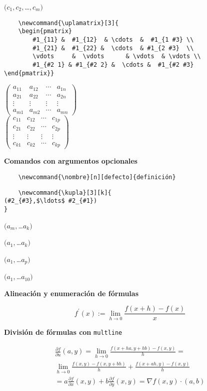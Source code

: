 \documentclass[12pt]{book}
\newcommand{\tto}{\longrightarrow}
\newcommand{\parcial}[2]{\frac{\partial#1}{\partial#2}}
\newcommand{\upla}[2]{(#1_1,#1_2,$\ldots$,#1_{#2})}
\newcommand{\uplamatrix}[3]{
	\begin{pmatrix}  
		#1_{11} &  #1_{12}  & \cdots  &  #1_{1 #3} \\   
		#1_{21} &  #1_{22} &  \cdots  & #1_{2 #3}  \\ 
		\vdots     &  \vdots      & \vdots  & \vdots \\
	#1_{#2 1} & #1_{#2 2} &  \cdots &  #1_{#2 #3}
\end{pmatrix}}
\newcommand{\kupla}[3][k]{
	(#2_{#3},$\ldots$ #2_{#1})	
}
\begin{document}
$\upla{c}{m}$


\begin{verbatim}
	\newcommand{\uplamatrix}[3]{
	\begin{pmatrix}  
		#1_{11} &  #1_{12}  & \cdots  &  #1_{1 #3} \\   
		#1_{21} &  #1_{22} &  \cdots  & #1_{2 #3}  \\ 
		\vdots     &  \vdots      & \vdots  & \vdots \\
		#1_{#2 1} & #1_{#2 2} &  \cdots &  #1_{#2 #3}
\end{pmatrix}}
\end{verbatim}


$\uplamatrix{a}{m}{n}$\\

$\uplamatrix{c}{k}{p}$\\

\vspace{1.5cm}

\noindent\textbf{Comandos con argumentos opcionales}

\begin{verbatim}
	\newcommand{\nombre}[n][defecto]{definición}
\end{verbatim}


\begin{verbatim}
	\newcommand{\kupla}[3][k]{
(#2_{#3},$\ldots$ #2_{#1})	
}
\end{verbatim}


$\kupla{a}{m}$

$\kupla{a}{1}$

$\kupla[p]{a}{1}$


$\kupla[10]{a}{1}$

\vspace{1.5cm}

\noindent\textbf{Alineación y enumeración de fórmulas}


\begin{equation}
	f^{\prime}(x):=\lim\limits_{h\to 0}\frac{f(x+h)-f(x)}{x}
\end{equation}

\vspace{1.5cm}

\noindent\textbf{División de fórmulas con} \verb*|multline|

\begin{multline}
	\parcial {f}{u}(a,y)=\lim\limits_{h\tto 0}\frac{f(x+h a,y+hb)-f(x,y)}{h}=\\
	\lim\limits_{h\tto 0}\frac{f(x,y)-f(x,y+bh)}{h}+\frac{f(x+ah,y)-f(x,y)}{h}\\
	=a\parcial{f}{x}(x,y)+b\parcial{f}{y}(x,y)=\nabla f(x,y)\cdot (a,b)
\end{multline}
\end{document}
